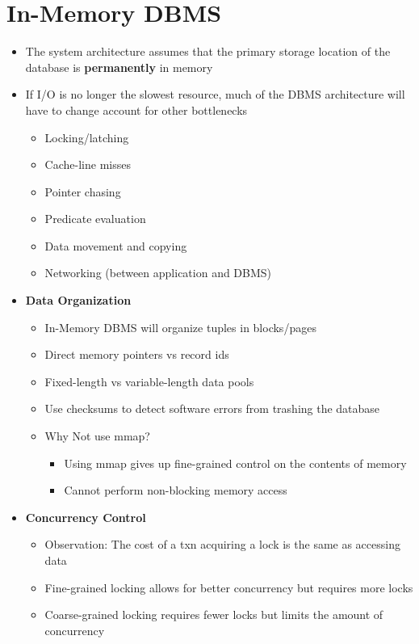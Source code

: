 \documentclass[11pt]{article}
\begin{document}
\section{In-Memory DBMS}
\begin{itemize}
    \item The system architecture assumes that the primary storage location of the database is \textbf{permanently} in memory
    \item If I/O is no longer the slowest resource, much of the DBMS architecture will have to change account for other bottlenecks
    \begin{itemize}
        \item Locking/latching
        \item Cache-line misses
        \item Pointer chasing
        \item Predicate evaluation
        \item Data movement and copying
        \item Networking (between application and DBMS)
    \end{itemize}
    \item \textbf{Data Organization}
    \begin{itemize}
        \item In-Memory DBMS will organize tuples in blocks/pages
        \item Direct memory pointers vs record ids
        \item Fixed-length vs variable-length data pools
        \item Use checksums to detect software errors from trashing the database
        \item Why Not use mmap?
        \begin{itemize}
            \item Using mmap gives up fine-grained control on the contents of memory
            \item Cannot perform non-blocking memory access
        \end{itemize}
    \end{itemize}
    \item \textbf{Concurrency Control}
    \begin{itemize}
        \item Observation: The cost of a txn acquiring a lock is the same as accessing data
        \item Fine-grained locking allows for better concurrency but requires more locks
        \item Coarse-grained locking requires fewer locks but limits the amount of concurrency

\end{itemize}
\end{itemize}
\end{document}
